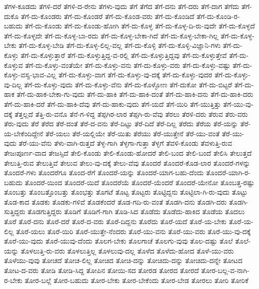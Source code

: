 {ತೆಗಳ-ಕೂಡದು
ತೆಗಳಿ-ದರೆ
ತೆಗಳಿ-ದ-ರೇನು
ತೆಗಳು-ವುದು
ತೆಗೆ
ತೆಗೆದ
ತೆಗೆ-ದನು
ತೆಗೆ-ದರು
ತೆಗೆ-ದಾಗ
ತೆಗೆದು
ತೆಗೆ-ದುಕೊ
ತೆಗೆ-ದು-ಕೊಂಡರು
ತೆಗೆ-ದು-ಕೊಂಡರೆ
ತೆಗೆ-ದು-ಕೊಂಡ-ವರು
ತೆಗೆ-ದು-ಕೊಂಡಿದೆ
ತೆಗೆ-ದು-ಕೊಂಡಿ-ರ-ಬಹುದು
ತೆಗೆ-ದು-ಕೊಂಡು
ತೆಗೆ-ದು-ಕೊಂಡು-ಹೋಗಿ
ತೆಗೆ-ದು-ಕೊಳ್ಳ
ತೆಗೆ-ದು-ಕೊಳ್ಳ-ದಿ-ರು-ವುದೇ
ತೆಗೆ-ದು-ಕೊಳ್ಳದೆ
ತೆಗೆ-ದು-ಕೊಳ್ಳದೇ
ತೆಗೆ-ದು-ಕೊಳ್ಳ-ಬಾ-ರದು
ತೆಗೆ-ದು-ಕೊಳ್ಳ-ಬೇಕಾ-ಗಿದೆ
ತೆಗೆ-ದು-ಕೊಳ್ಳ-ಬೇಕಾ-ಗಿಲ್ಲ
ತೆಗೆ-ದು-ಕೊಳ್ಳ-ಬೇಕು
ತೆಗೆ-ದು-ಕೊಳ್ಳ-ಬೇಡಿ
ತೆಗೆ-ದು-ಕೊಳ್ಳ-ಲಿಲ್ಲ-ವಲ್ಲ
ತೆಗೆ-ದು-ಕೊಳ್ಳಿ
ತೆಗೆ-ದು-ಕೊಳ್ಳಿ-ವಿಜ್ಞಾನಿ-ಗಳು
ತೆಗೆ-ದು-ಕೊಳ್ಳು
ತೆಗೆ-ದು-ಕೊಳ್ಳುತ್ತಾರೆ
ತೆಗೆ-ದು-ಕೊಳ್ಳುತ್ತಿದ್ದ-ವ-ರಲ್ಲಿ
ತೆಗೆ-ದು-ಕೊಳ್ಳುತ್ತಿದ್ದವು
ತೆಗೆ-ದು-ಕೊಳ್ಳುತ್ತೇವೆ
ತೆಗೆ-ದು-ಕೊಳ್ಳುವ
ತೆಗೆ-ದು-ಕೊಳ್ಳು-ವಂತೆಯೇ
ತೆಗೆ-ದು-ಕೊಳ್ಳು-ವನು
ತೆಗೆ-ದು-ಕೊಳ್ಳು-ವರು
ತೆಗೆ-ದು-ಕೊಳ್ಳು-ವಷ್ಟು
ತೆಗೆ-ದು-ಕೊಳ್ಳು-ವಸ್ವ-ಭಾವ-ವಿಲ್ಲ
ತೆಗೆ-ದು-ಕೊಳ್ಳು-ವಾಗ
ತೆಗೆ-ದು-ಕೊಳ್ಳು-ವು-ದಕ್ಕೆ
ತೆಗೆ-ದು-ಕೊಳ್ಳು-ವುದರ
ತೆಗೆ-ದು-ಕೊಳ್ಳು-ವು-ದಿಲ್ಲ
ತೆಗೆ-ದು-ಕೊಳ್ಳು-ವುದು
ತೆಗೆ-ದು-ಕೊಳ್ಳು-ವೆನು
ತೆಗೆ-ದು-ಕೊಳ್ಳೋಣ
ತೆಗೆ-ದುಕೋ
ತೆಗೆ-ದು-ಬಿಟ್ಟರೆ
ತೆಗೆ-ದು-ಹಾಕ
ತೆಗೆ-ದು-ಹಾಕ-ಬೇಕಾ-ಗು-ವುದು
ತೆಗೆ-ದು-ಹಾಕಿ
ತೆಗೆ-ದು-ಹಾಕಿ-ದಂತೆ
ತೆಗೆ-ದು-ಹಾಕಿ-ದನು
ತೆಗೆ-ದು-ಹಾಕಿ-ದರು
ತೆಗೆ-ದು-ಹಾಕಿ-ದರೆ
ತೆಗೆ-ದು-ಹಾಕಿ-ದೆವು
ತೆಗೆ-ದು-ಹಾಕು-ವುದು
ತೆಗೆ-ಯದೆ
ತೆಗೆ-ಯಿರಿ
ತೆಗೆ-ಯುತ್ತಿತ್ತು
ತೆಗೆ-ಯು-ವು-ದಕ್ಕೆ
ತೆತ್ತಲ್ಲದೆ
ತೆತ್ತಿ-ರು-ವನೊ
ತೆನೆ-ಗ-ಳಿದ್ದ
ತೆಪ್ಪಗಿರ-ಲಾರ
ತೆಪ್ಪಗಿ-ರು-ವೆವು
ತೆರಲು
ತೆರಳಿ-ದರು
ತೆರುವ
ತೆರು-ವರು
ತೆರು-ವುದು
ತೆರೆ
ತೆರೆದ
ತೆರೆ-ದಂತೆ
ತೆರೆ-ದ-ವನು
ತೆರೆ-ದಿಟ್ಟು
ತೆರೆ-ದಿದೆ
ತೆರೆ-ದಿಲ್ಲ
ತೆರೆದು
ತೆರೆಯ
ತೆರೆ-ಯನ್ನು
ತೆರೆ-ಯ-ಬೇಕೆಂದಿದ್ದೇನೆ
ತೆರೆ-ಯಲು
ತೆರೆ-ಯಲ್ಲಿಯೇ
ತೆರೆ-ಯಿತು
ತೆರೆಯು
ತೆರೆ-ಯುತ್ತೇನೆ
ತೆರೆ-ಯು-ವಂತೆ
ತೆರೆ-ಯು-ವುದು
ತೆರೆ-ಯು-ವೆನು
ತೆಳು-ವಾಗಿ-ರುತ್ತದೆ
ತೆಳ್ಳ-ಗಾಗಿ
ತೆಳ್ಳಗಾ-ಗುತ್ತಾ
ತೆಳ್ಳಗೆ
ತೆವಳಿ-ಕೊಂಡು
ತೆವಳುತ್ತಿ-ರುವ
ತೇಜಃಪೂರ್ಣ-ವಾದ
ತೇಜಸ್ಸಿದೆ
ತೇಲಿ-ಕೊಂಡು
ತೇಲಿ-ಕೊಂಡು-ಹೋದರೆ
ತೇಲಿ-ಬಂದ
ತೇಲಿ-ಬಂದೆ
ತೇಲಿಸಿ
ತೇಲುತ್ತದೆ
ತೇಲುತ್ತಿ-ರುವ
ತೇಲುತ್ತಿವೆ
ತೇಲುವ
ತೇಲು-ವು-ದಕ್ಕೆ
ತೇಲು-ವೆವು
ತೊಂದರೆ
ತೊಂದರೆ-ಕೊಡ-ಲಾರ
ತೊಂದರೆ-ಗಳನ್ನು
ತೊಂದರೆ-ಗಳು
ತೊಂದರೆಗೂ
ತೊಂದ-ರೆಗೆ
ತೊಂದರೆ-ಯನ್ನು
ತೊಂದರೆ-ಯಾಗ-ಬಹು-ದೆಂದು
ತೊಂದರೆ-ಯಾಗಿ-ರ-ಬಹುದು
ತೊಂದರೆ-ಯಿಂದ
ತೊಂದರೆ-ಯಿದೆ
ತೊಂದರೆಯೆ
ತೊಂದರೆ-ಯೆಂದರೆ
ತೊಂದರೆ-ಯೇನೋ
ತೊಂಬತ್ತ-ರಷ್ಟು
ತೊಂಬತ್ತು
ತೊಂಬತ್ತೊಂಬತ್ತು
ತೊಂಭತ್ತು
ತೊಗಟೆ
ತೊಟ್ಟ
ತೊಟ್ಟರು
ತೊಟ್ಟಿದ್ದನು
ತೊಟ್ಟಿಲಾ-ಗಿ-ರು-ವುದು
ತೊಟ್ಟು
ತೊಡ-ಕಾದ
ತೊಡಕು
ತೊಡಕು-ಗಳಿವೆ
ತೊಡಕೆಂದರೆ
ತೊಡ-ಗದಿ-ರು-ವಂತೆ
ತೊಡಗಿ-ದನು
ತೊಡಗಿ-ದರು
ತೊಡಗಿ-ಸುತ್ತಿದ್ದರು
ತೊಡಗುತ್ತಿದ್ದರು
ತೊಡಿಗೆ
ತೊಡಿಗೆ-ಗಾಗಿ
ತೊಡಿ-ಸಿದ
ತೊಡೆದು
ತೊಡೆದು-ಹಾಕಿದ
ತೊಡೆಯ
ತೊದಲು
ತೊರೆ
ತೊರೆ-ದನು
ತೊರೆ-ದರೆ
ತೊರೆ-ದ-ವರು
ತೊರೆ-ದಿದ್ದನು
ತೊರೆದು
ತೊರೆ-ಯದೆ
ತೊರೆ-ಯ-ಬೇಕು
ತೊರೆ-ಯ-ಲಿಲ್ಲ
ತೊರೆ-ಯಲು
ತೊರೆ-ಯಿರಿ
ತೊರೆ-ಯುತ್ತೇ-ನೆಂದರು
ತೊರೆ-ಯು-ವನು
ತೊರೆ-ಯು-ವರು
ತೊರೆ-ಯು-ವು-ದಕ್ಕೆ
ತೊರೆ-ಯು-ವುದು
ತೊರೆ-ಯುವು-ದೆಂದು
ತೊಲಗ-ಬೇಕು
ತೊಲಗಾಚೆ
ತೊಲಗು-ವುವು
ತೊಲ-ದಷ್ಟು
ತೊಲೆ
ತೊಲೆ-ಯನ್ನು
ತೊಳಲುತ್ತಿ-ರು-ವರು
ತೊಳಲುತ್ತಿಲ್ಲ
ತೊಳಲುವು-ದಲ್ಲ
ತೊಳೆದ
ತೊಳೆದು-ಹೋದ
ತೊಳೆ-ಯು-ವರು
ತೊಳೆಯು-ವುವು
ತೋಚದೆ
ತೋಚ-ಲಿಲ್ಲ
ತೋಚಿದ
ತೋಚಿ-ದನ್ನು
ತೋಚಿದು-ದನ್ನು
ತೋಚಿದು-ದನ್ನೇ
ತೋಟದ
ತೋಟ-ದ-ವರು
ತೋಡಿ
ತೋಡಿ-ಸಿದ್ದ
ತೋಪಿನ
ತೋಯಿ-ಸದ
ತೋರಡ
ತೋರದ
ತೋರದೆ
ತೋರ-ಬಲ್ಲ-ವ-ನಾಗಿ-ರ-ಬೇಕು
ತೋರ-ಬಲ್ಲೆ
ತೋರ-ಬಹುದು
ತೋರ-ಬೇಕು
ತೋರ-ಬೇಕೆಂದು
ತೋರ-ಬೇಡ
ತೋರಲು
ತೋರಿ
ತೋರಿಕೆ
}
